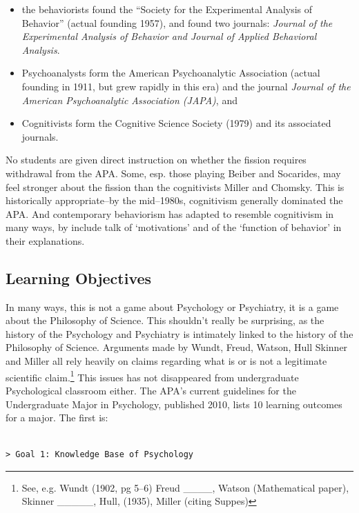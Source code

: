 \begin{itemize}
\item the behaviorists found the ``Society for the Experimental Analysis of Behavior'' (actual founding 1957), and found two journals: \emph{Journal of the Experimental Analysis of Behavior and Journal of Applied Behavioral Analysis}. 

\item Psychoanalysts form the American Psychoanalytic Association (actual founding in 1911, but grew rapidly in this era) and the journal \emph{Journal of the American Psychoanalytic Association (JAPA)}, and 

\item Cognitivists form the Cognitive Science Society (1979) and its associated journals. 

\end{itemize}

No students are given direct instruction on whether the fission requires withdrawal from the APA. Some, esp. those playing Beiber and Socarides, may feel stronger about the fission than the cognitivists Miller and Chomsky. This is historically appropriate–by the mid--1980s, cognitivism generally dominated the APA. And contemporary behaviorism has adapted to resemble cognitivism in many ways, by include talk of `motivations' and of the `function of behavior' in their explanations.

\newpage

\subsection{Learning Objectives}
\label{learningobjectives}

In many ways, this is not a game about Psychology or Psychiatry, it is a game about the Philosophy of Science. This shouldn't really be surprising, as the history of the Psychology and Psychiatry is intimately linked to the history of the Philosophy of Science. Arguments made by Wundt, Freud, Watson, Hull Skinner and Miller all rely heavily on claims regarding what is or is not a legitimate scientific claim.\footnote{See, e.g. Wundt (1902, pg 5--6) Freud \_\_\_\_, Watson (Mathematical paper), Skinner \_\_\_\_\_, Hull, (1935), Miller (citing Suppes)} This issues has not disappeared from undergraduate Psychological classroom either. The APA's current guidelines for the Undergraduate Major in Psychology, published 2010, lists 10 learning outcomes for a major. The first is:

\begin{adjustwidth}{2.5em}{2.5em}
\begin{verbatim}

> Goal 1: Knowledge Base of Psychology

\end{verbatim}
\end{adjustwidth}

